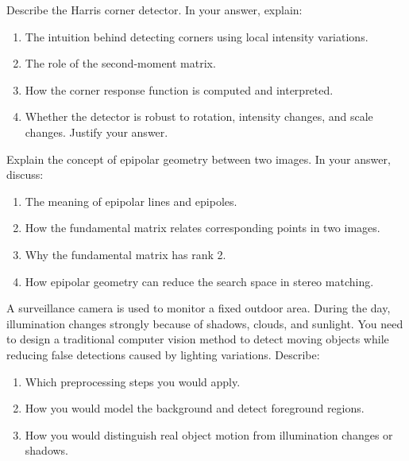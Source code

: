 \documentclass[12pt]{article}
\begin{document}
    \begin{ejercicio}[8 points]
        Describe the Harris corner detector. In your answer, explain:
        \begin{enumerate}
            \item[a)] The intuition behind detecting corners using local intensity variations.
            \item[b)] The role of the second-moment matrix.
            \item[c)] How the corner response function is computed and interpreted.
            \item[d)] Whether the detector is robust to rotation, intensity changes, and scale changes. Justify your answer.
        \end{enumerate}
    \end{ejercicio}

    \begin{ejercicio}[8 points]
        Explain the concept of epipolar geometry between two images. In your answer, discuss:
        \begin{enumerate}
            \item[a)] The meaning of epipolar lines and epipoles.
            \item[b)] How the fundamental matrix relates corresponding points in two images.
            \item[c)] Why the fundamental matrix has rank 2.
            \item[d)] How epipolar geometry can reduce the search space in stereo matching.
        \end{enumerate}
    \end{ejercicio}

    \begin{ejercicio}[8 points]
        A surveillance camera is used to monitor a fixed outdoor area. During the day, illumination changes strongly because of shadows, clouds, and sunlight. You need to design a traditional computer vision method to detect moving objects while reducing false detections caused by lighting variations. Describe:
        \begin{enumerate}
            \item[a)] Which preprocessing steps you would apply.
            \item[b)] How you would model the background and detect foreground regions.
            \item[c)] How you would distinguish real object motion from illumination changes or shadows.
        \end{enumerate}
    \end{ejercicio}
\end{document}
